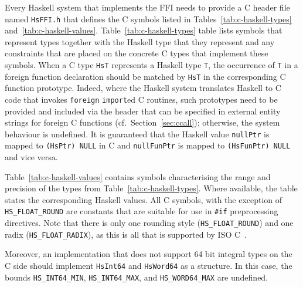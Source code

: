 \documentclass[a4paper,twoside]{article}
\newcommand{\code}[1]{\texttt{#1}}      %
\begin{document}
%
Every Haskell system that implements the FFI needs to provide a C header file
named \code{HsFFI.h} that defines the C symbols listed in
Tables~\ref{tab:c-haskell-types} and~\ref{tab:c-haskell-values}.
Table~\ref{tab:c-haskell-types} table lists symbols that represent types
together with the Haskell type that they represent and any constraints that
are placed on the concrete C types that implement these symbols.  When a C
type \code{HsT} represents a Haskell type \code{T}, the occurrence of \code{T}
in a foreign function declaration should be matched by \code{HsT} in the
corresponding C function prototype.  Indeed, where the Haskell system
translates Haskell to C code that invokes \code{foreign} \code{import}ed C
routines, such prototypes need to be provided and included via the header that
can be specified in external entity strings for foreign C functions (cf.\ 
Section~\ref{sec:ccall}); otherwise, the system behaviour is undefined.  It is
guaranteed that the Haskell value \code{nullPtr} is mapped to \code{(HsPtr)
  NULL} in C and \code{nullFunPtr} is mapped to \code{(HsFunPtr) NULL} and
vice versa.

Table~\ref{tab:c-haskell-values} contains symbols characterising the range and
precision of the types from Table~\ref{tab:c-haskell-types}.  Where available,
the table states the corresponding Haskell values.  All C symbols, with the
exception of \code{HS\_FLOAT\_ROUND} are constants that are suitable for use in
\code{\#if} preprocessing directives.  Note that there is only one rounding
style (\code{HS\_FLOAT\_ROUND}) and one radix (\code{HS\_FLOAT\_RADIX}), as
this is all that is supported by ISO C~\cite{C99}.

Moreover, an implementation that does not support 64 bit integral types on the
C side should implement \code{HsInt64} and \code{HsWord64} as a structure.  In
this case, the bounds \code{HS\_INT64\_MIN}, \code{HS\_INT64\_MAX}, and
\code{HS\_WORD64\_MAX} are undefined.
\end{document}
